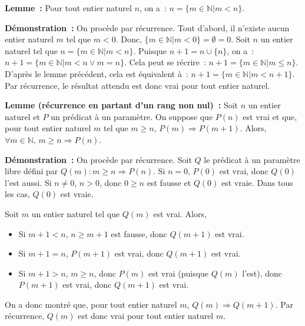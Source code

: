 \medskip

\noindent\textbf{Lemme :} 
    Pour tout entier naturel $n$, on a : $n = \lbrace m \in \mathbb{N} \vert m < n \rbrace$. 

\medskip

\noindent\textbf{Démonstration :} 
    On procède par récurrence. 
    Tout d'abord, il n'existe aucun entier naturel $m$ tel que $m < 0$. 
    Donc, $\lbrace m \in \mathbb{N} \vert m < 0 \rbrace = \emptyset = 0$. 
    Soit $n$ un entier naturel tel que $n = \lbrace m \in \mathbb{N} \vert m < n \rbrace$. 
    Puisque $n+1 = n \cup \lbrace n \rbrace$, on a : $n + 1 = \lbrace m \in \mathbb{N} \vert m < n \vee m = n \rbrace$. 
    Cela peut se récrire : $n + 1 = \lbrace m \in \mathbb{N} \vert m \leq n \rbrace$. 
    D'après le lemme précédent, cela est équivalent à : $n + 1 = \lbrace m \in \mathbb{N} \vert m < n + 1 \rbrace$. 
    Par récurrence, le résultat attendu est donc vrai pour tout entier naturel.
    
   \done 

\medskip

\noindent\textbf{Lemme (récurrence en partant d'un rang non nul) :} 
    Soit $n$ un entier naturel et $P$ un prédicat à un paramètre. 
    On suppose que $P(n)$ est vrai et que, pour tout entier naturel $m$ tel que $m \geq n$, $P(m) \Rightarrow P(m+1)$. 
    Alors, $\forall m \in \mathbb{N}, \, m \geq n \Rightarrow P(n)$.

\medskip

\noindent\textbf{Démonstration :} On procède par récurrence. 
    Soit $Q$ le prédicat à un paramètre libre défini par $Q(m): m \geq n \Rightarrow P(n)$.
    Si $n = 0$, $P(0)$ est vrai, donc $Q(0)$ l'est aussi. 
    Si $n \neq 0$, $n > 0$, donc $0 \geq n$ est fausse et $Q(0)$ est vraie. 
    Dans  tous les cas, $Q(0)$ est vraie. 

    Soit $m$ un entier naturel tel que $Q(m)$ est vrai. 
    Alors, 
    \begin{itemize}[nosep]
        \item Si $m+1 < n$, $n \geq m+1$ est fausse, donc $Q(m+1)$ est vrai.
        \item Si $m+1 = n$, $P(m+1)$ est vrai, donc $Q(m+1)$ est vrai.
        \item Si $m+1 > n$, $m \geq n$, donc $P(m)$ est vrai (puisque $Q(m)$ l'est), donc $P(m+1)$ est vrai, donc $Q(m+1)$ est vrai.
    \end{itemize}
    On a donc montré que, pour tout entier naturel $m$, $Q(m) \Rightarrow Q(m+1)$. 
    Par récurrence, $Q(m)$ est donc vrai pour tout entier naturel $m$.

